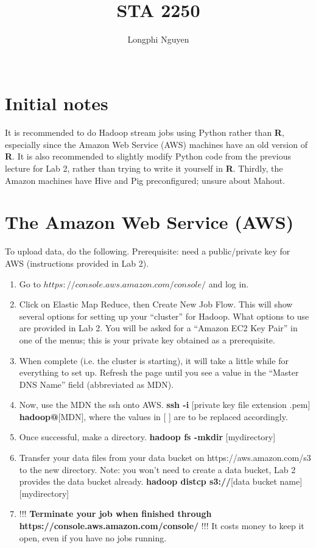 \documentclass{article}
\title{STA 2250}
\author{Longphi Nguyen\\ \\}
\begin{document}
\section{Initial notes}

It is recommended to do Hadoop stream jobs using Python rather than \textbf{R}, especially since the Amazon Web Service (AWS) machines have an old version of \textbf{R}. It is also recommended to slightly modify Python code from the previous lecture for Lab 2, rather than trying to write it yourself in \textbf{R}. Thirdly, the Amazon machines have Hive and Pig preconfigured; unsure about Mahout.

\section{The Amazon Web Service (AWS)}
To upload data, do the following. Prerequisite: need a public/private key for AWS (instructions provided in Lab 2).

\begin{enumerate}
\item Go to $https://console.aws.amazon.com/console/$ and log in.
\item Click on Elastic Map Reduce, then Create New Job Flow. This will show several options for setting up your ``cluster'' for Hadoop. What options to use are provided in Lab 2. You will be asked for a ``Amazon EC2 Key Pair'' in one of the menus; this is your private key obtained as a prerequisite.
\item When complete (i.e. the cluster is starting), it will take a little while for everything to set up. Refresh the page until you see a value in the ``Master DNS Name'' field (abbreviated as MDN).
\item Now, use the MDN the ssh onto AWS. \textbf{ssh -i }[private key file extension .pem]\textbf{ hadoop@}[MDN], where the values in [ ] are to be replaced accordingly.
\item Once successful, make a directory. \textbf{hadoop fs -mkdir }[mydirectory]
\item Transfer your data files from your data bucket on https://aws.amazon.com/s3 to the new directory. Note: you won't need to create a data bucket, Lab 2 provides the data bucket already. \textbf{hadoop distcp s3://}[data bucket name] [mydirectory]
\item !!! \textbf{Terminate your job when finished through https://console.aws.amazon.com/console/} !!! It costs money to keep it open, even if you have no jobs running.
\end{enumerate}
\end{document}
